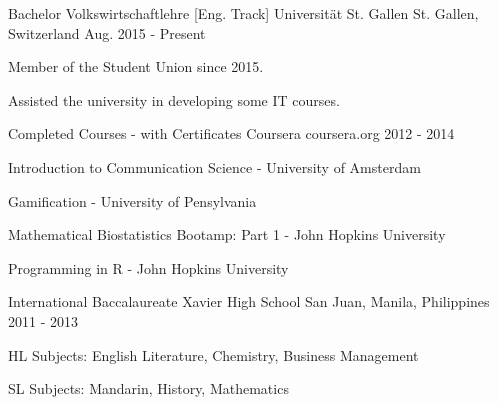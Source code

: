 \begin{cventries}

  \cventry
    {Bachelor Volkswirtschaftlehre [Eng. Track]} %
    {Universität St. Gallen} %
    {St. Gallen, Switzerland} %
    {Aug. 2015 - Present} %
    {} %
    {
      \begin{cvitems} %
        \item {Member of the Student Union since 2015.}
        \item {Assisted the university in developing some IT courses.}
      \end{cvitems}
    }

  \cventry
  {Completed Courses - with Certificates} %
  {Coursera} %
  {coursera.org} %
  {2012 - 2014} %
  {} %
  {
    \begin{cvitems} %
        \item {Introduction to Communication Science - University of Amsterdam}
        \item {Gamification - University of Pensylvania}
        \item {Mathematical Biostatistics Bootamp: Part 1 - John Hopkins University}
        \item {Programming in R - John Hopkins University}
    \end{cvitems}
  }

  \cventry
    {International Baccalaureate} %
    {Xavier High School} %
    {San Juan, Manila, Philippines} %
    {2011 - 2013} %
    {} %
    {
      \begin{cvitems} %
        \item {HL Subjects: English Literature, Chemistry, Business Management }
        \item {SL Subjects: Mandarin, History, Mathematics }
      \end{cvitems}
    }

\end{cventries}
